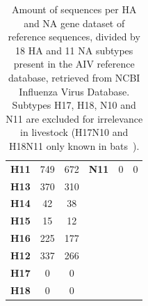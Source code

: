 \begin{table}[ht!]
\begin{tabular}{@{}lcclcc@{}}
	\textbf{H11} & 749          & 672          & \textbf{N11} & 0            & 0            \\
	\textbf{H13} & 370          & 310          &              &              &              \\
	\textbf{H14} & 42           & 38           &              &              &              \\
	\textbf{H15} & 15           & 12           &              &              &              \\
	\textbf{H16} & 225          & 177          &              &              &              \\
	\textbf{H12} & 337          & 266          &              &              &              \\
	\textbf{H17} & 0            & 0            &              &              &              \\
	\textbf{H18} & 0            & 0            &              &              &              \\ \hline
	\end{tabular}
	\caption[AIV reference collection by HA and NA subtypes.]{Amount of sequences per HA and NA gene dataset of reference sequences, divided by 18 HA and 11 NA subtypes present in the AIV reference database, retrieved from NCBI Influenza Virus Database. Subtypes H17, H18, N10 and N11 are excluded for irrelevance in livestock (H17N10 and H18N11 only known in bats~\cite{tong2013new}).}
\label{tab:apx-aiv-ref-subtypes}
\end{table}

